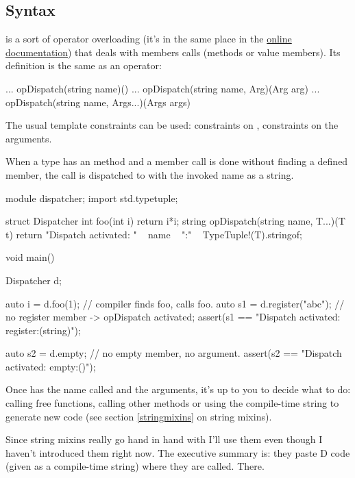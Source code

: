 \subsection{Syntax}\label{opdispatchsyntax}

 is a sort of operator overloading (it's in the same place in the \href{www.dlang.org/operatoroverloading.html#Dispatch}{online documentation}) that deals with members calls (methods or value members). Its definition is the same as an operator:

\begin{dcode}
... opDispatch(string name)()
... opDispatch(string name, Arg)(Arg arg)
... opDispatch(string name, Args...)(Args args)
\end{dcode}

The usual template constraints can be used: constraints on , constraints on the arguments.

When a type has an  method and a member call is done without finding a defined member, the call is dispatched to  with the invoked name as a string.

\begin{dcode}
module dispatcher;
import std.typetuple;

struct Dispatcher
{
    int foo(int i) { return i*i;}
    string opDispatch(string name, T...)(T t)
    {
        return "Dispatch activated: " ~ name ~ ":" ~ TypeTuple!(T).stringof;
    }
}

void main()
{
    Dispatcher d;

    auto i = d.foo(1); // compiler finds foo, calls foo.
    auto s1 = d.register("abc"); // no register member -> opDispatch activated;
    assert(s1 == "Dispatch activated: register:(string)");

    auto s2 = d.empty; // no empty member, no argument.
    assert(s2 == "Dispatch activated: empty:()");
}
\end{dcode}

Once  has the name called and the arguments, it's up to you to decide what to do: calling free functions, calling other methods or using the compile-time string to generate new code (see section \ref{stringmixins} on string mixins).

Since string mixins really go hand in hand with  I'll use them even though I haven't introduced them right now. The executive summary is: they paste D code (given as a compile-time string) where they are called. There.

